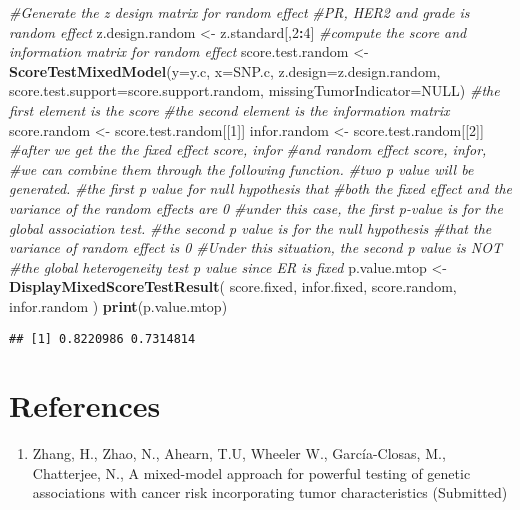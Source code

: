 \documentclass[11pt,]{article}
\newenvironment{Shaded}{\begin{snugshade}}{\end{snugshade}}
\newcommand{\CommentTok}[1]{\textcolor[rgb]{0.56,0.35,0.01}{\textit{#1}}}
\newcommand{\DataTypeTok}[1]{\textcolor[rgb]{0.13,0.29,0.53}{#1}}
\newcommand{\DecValTok}[1]{\textcolor[rgb]{0.00,0.00,0.81}{#1}}
\newcommand{\KeywordTok}[1]{\textcolor[rgb]{0.13,0.29,0.53}{\textbf{#1}}}
\newcommand{\NormalTok}[1]{#1}
\newcommand{\OperatorTok}[1]{\textcolor[rgb]{0.81,0.36,0.00}{\textbf{#1}}}
\newcommand{\OtherTok}[1]{\textcolor[rgb]{0.56,0.35,0.01}{#1}}
\newcommand{\StringTok}[1]{\textcolor[rgb]{0.31,0.60,0.02}{#1}}
\providecommand{\tightlist}{%
\setlength{\itemsep}{0pt}\setlength{\parskip}{0pt}}
\begin{document}
\begin{Shaded}
\begin{Highlighting}[]
\CommentTok{#Generate the z design matrix for random effect}
\CommentTok{#PR, HER2 and grade is random effect}
\NormalTok{z.design.random <-}\StringTok{ }\NormalTok{z.standard[,}\DecValTok{2}\OperatorTok{:}\DecValTok{4}\NormalTok{]}
\CommentTok{#compute the score and information matrix for random effect}
\NormalTok{score.test.random <-}\StringTok{ }\KeywordTok{ScoreTestMixedModel}\NormalTok{(}\DataTypeTok{y=}\NormalTok{y.c,}
                                         \DataTypeTok{x=}\NormalTok{SNP.c,}
                                         \DataTypeTok{z.design=}\NormalTok{z.design.random,}
                                         \DataTypeTok{score.test.support=}\NormalTok{score.support.random,}
                                         \DataTypeTok{missingTumorIndicator=}\OtherTok{NULL}\NormalTok{)}
\CommentTok{#the first element is the score}
\CommentTok{#the second element is the information matrix}
\NormalTok{score.random <-}\StringTok{ }\NormalTok{score.test.random[[}\DecValTok{1}\NormalTok{]]}
\NormalTok{infor.random <-}\StringTok{ }\NormalTok{score.test.random[[}\DecValTok{2}\NormalTok{]]}
\CommentTok{#after we get the the fixed effect score, infor }
\CommentTok{#and random effect score, infor, }
\CommentTok{#we can combine them through the following function. }
\CommentTok{#two p value will be generated.}
\CommentTok{#the first p value for null hypothesis that}
\CommentTok{#both the fixed effect and the variance of the random effects are 0}
\CommentTok{#under this case, the first p-value is for the global association test.}
\CommentTok{#the second p value is for the null hypothesis }
\CommentTok{#that the variance of random effect is 0}
\CommentTok{#Under this situation, the second p value is NOT }
\CommentTok{#the global heterogeneity test p value since ER is fixed}
\NormalTok{p.value.mtop <-}\StringTok{ }\KeywordTok{DisplayMixedScoreTestResult}\NormalTok{(}
\NormalTok{  score.fixed,}
\NormalTok{  infor.fixed,}
\NormalTok{  score.random,}
\NormalTok{  infor.random}
\NormalTok{)  }
\KeywordTok{print}\NormalTok{(p.value.mtop)}
\end{Highlighting}
\end{Shaded}

\begin{verbatim}
## [1] 0.8220986 0.7314814
\end{verbatim}

\hypertarget{references}{%
\section{References}\label{references}}

\begin{enumerate}
\def\labelenumi{\arabic{enumi}.}
\tightlist
\item
  Zhang, H., Zhao, N., Ahearn, T.U, Wheeler W., García-Closas, M.,
  Chatterjee, N., A mixed-model approach for powerful testing of genetic
  associations with cancer risk incorporating tumor characteristics
  (Submitted)
\end{enumerate}




\newpage
\singlespacing 
\end{document}
